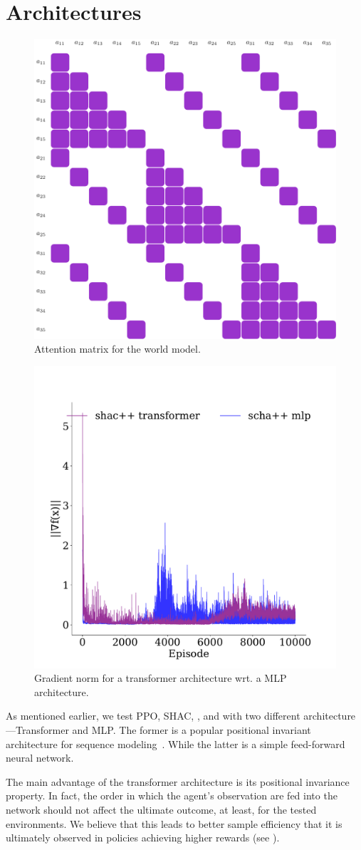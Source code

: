 



\section{Architectures}\label{apx:arch}


\begin{figure}[t]
    \centering
    \includegraphics[width=.45\textwidth]{figs/attention.pdf} 
    \caption{Attention matrix for the world model.}\vspace{0.5cm}
    \label{apx:fig:attention}
\end{figure}

\begin{figure}[t]
    \centering
    \includegraphics[width=.45\textwidth]{figs/grads-mlp-transport.pdf}
    \caption{Gradient norm for a transformer architecture wrt. a MLP architecture.}\vspace{0.5cm}
    \label{fig:grads-mlp}
\end{figure}
As mentioned earlier, we test PPO, SHAC, \fname{}, and \fnamer{} with two different architecture---Transformer and MLP. The former is a popular positional invariant architecture for sequence modeling~\cite{Vaswani17}. While the latter is a simple feed-forward neural network.

The main advantage of the transformer architecture is its positional invariance property. In fact, the order in which the agent's observation are fed into the network should not affect the ultimate outcome, at least, for the tested environments. We believe that this leads to better sample efficiency that it is ultimately observed in policies achieving higher rewards (see ). 

